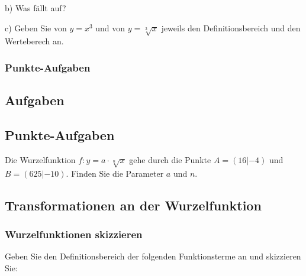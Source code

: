 
b) Was fällt auf?


c) Geben Sie von $y=x^3$ und von $y=\sqrt[3]{x}$ jeweils den
Definitionsbereich und den Werteberech an.


\newpage


\subsubsection{Punkte-Aufgaben}

\subsection*{Aufgaben}

\subsection{Punkte-Aufgaben}
Die Wurzelfunktion $f: y= a\cdot{} \sqrt[n]{x}$ gehe durch die Punkte
$A= (16 | -4)$ und $B=(625 | -10)$. Finden Sie die Parameter $a$ und
$n$.


\newpage


\subsection{Transformationen an der Wurzelfunktion}

\subsubsection{Wurzelfunktionen skizzieren}


Geben Sie den Definitionsbereich der folgenden Funktionsterme an und skizzieren Sie:

